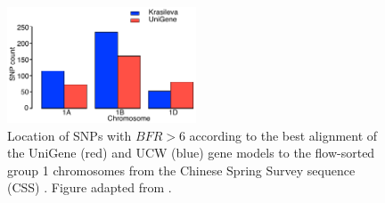 \begin{figure}
  \centering
    \includegraphics[width=0.5\textwidth]{Yr15/Figures/mapping/snpsBFR6Group1.pdf}
  \caption{Location of SNPs with $BFR>6$ according to the best alignment of the UniGene (red) and UCW (blue) gene models to the flow-sorted group 1 chromosomes from the Chinese Spring Survey sequence (CSS) \citep{Mayer2014}. Figure adapted from \citet{Ramirez-Gonzalez2015b}.} 
  \label{fig:yr15:snpsBFR6Group1}
\end{figure}



